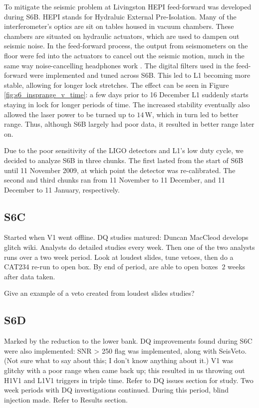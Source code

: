To mitigate the seismic problem at Livingston HEPI feed-forward was developed during S6B. HEPI stands for Hydraluic External Pre-Isolation. Many of the interferometer's optics are sit on tables housed in vacuum chambers. These chambers are situated on hydraulic actuators, which are used to dampen out seismic noise. In the feed-forward process, the output from seismometers on the floor were fed into the actuators to cancel out the seismic motion, much in the same way noise-cancelling headphones work \cite{ref:Lundgren_comm}. The digital filters used in the feed-forward were implemented and tuned across S6B. This led to L1 becoming more stable, allowing for longer lock stretches. The effect can be seen in Figure \ref{fig:s6_insprange_v_time}: a few days prior to 16 December L1 suddenly starts staying in lock for longer periods of time. The increased stability eventually also allowed the laser power to be turned up to $14\,$W, which in turn led to better range. Thus, although S6B largely had poor data, it resulted in better range later on.

Due to the poor sensitivity of the \ac{LIGO} detectors and L1's low duty cycle, we decided to analyze S6B in three chunks. The first lasted from the start of S6B until 11 November 2009, at which point the detector was re-calibrated. The second and third chunks ran from 11 November to 11 December, and 11 December to 11 January, respectively.

\subsection{S6C}

Started when V1 went offline. DQ studies matured: Duncan MacCleod develops glitch wiki. Analysts do detailed studies every week. Then one of the two analysts runs \ihope over a two week period. Look at loudest slides, tune vetoes, then do a CAT234 re-run to open box. By end of period, are able to open boxes $~2$ weeks after data taken.

Give an example of a veto created from loudest slides studies?

\subsection{S6D}

Marked by the reduction to the lower bank. DQ improvements found during S6C were also implemented: SNR > 250 flag was implemented, along with SeisVeto. (Not sure what to say about this; I don't know anything about it.) V1 was glitchy with a poor range when came back up; this resulted in us throwing out H1V1 and L1V1 triggers in triple time. Refer to DQ issues section for study. Two week \ihope periods with DQ investigations continued. During this period, blind injection made. Refer to Results section. 

